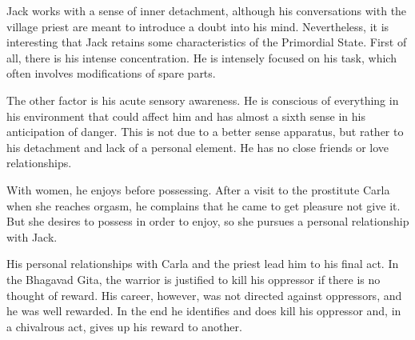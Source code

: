 Jack works with a sense of inner detachment, although his conversations with the village priest are meant to introduce a doubt into his mind. Nevertheless, it is interesting that Jack retains some characteristics of the Primordial State. First of all, there is his intense concentration. He is intensely focused on his task, which often involves modifications of spare parts.

The other factor is his acute sensory awareness. He is conscious of everything in his environment that could affect him and has almost a sixth sense in his anticipation of danger. This is not due to a better sense apparatus, but rather to his detachment and lack of a personal element. He has no close friends or love relationships.

With women, he enjoys before possessing. After a visit to the prostitute Carla when she reaches orgasm, he complains that he came to get pleasure not give it. But she desires to possess in order to enjoy, so she pursues a personal relationship with Jack.

His personal relationships with Carla and the priest lead him to his final act. In the Bhagavad Gita, the warrior is justified to kill his oppressor if there is no thought of reward. His career, however, was not directed against oppressors, and he was well rewarded. In the end he identifies and does kill his oppressor and, in a chivalrous act, gives up his reward to another.




